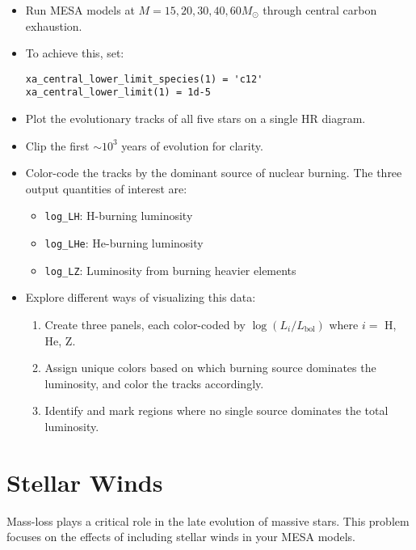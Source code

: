 \documentclass[11pt,a4paper]{article}
\begin{document}
\begin{itemize}[leftmargin=1.5em]
    \item Run MESA models at $M = 15, 20, 30, 40, 60 M_\odot$ through central carbon exhaustion.
    \item To achieve this, set:

    \begin{lstlisting}
xa_central_lower_limit_species(1) = 'c12'
xa_central_lower_limit(1) = 1d-5
    \end{lstlisting}

    \item Plot the evolutionary tracks of all five stars on a single HR diagram.
    \item Clip the first $\sim 10^3$ years of evolution for clarity.
    \item Color-code the tracks by the dominant source of nuclear burning. The three output quantities of interest are:
    \begin{itemize}
        \item \texttt{log\_LH}: H-burning luminosity
        \item \texttt{log\_LHe}: He-burning luminosity
        \item \texttt{log\_LZ}: Luminosity from burning heavier elements
    \end{itemize}
    \item Explore different ways of visualizing this data:
    \begin{enumerate}[label=(\alph*)]
        \item Create three panels, each color-coded by $\log (L_i/L_{\text{bol}})$ where $i = $ H, He, Z.
        \item Assign unique colors based on which burning source dominates the luminosity, and color the tracks accordingly.
        \item Identify and mark regions where no single source dominates the total luminosity.
    \end{enumerate}
\end{itemize}

\section{Stellar Winds}

Mass-loss plays a critical role in the late evolution of massive stars. This problem focuses on the effects of including stellar winds in your MESA models.
\end{document}
